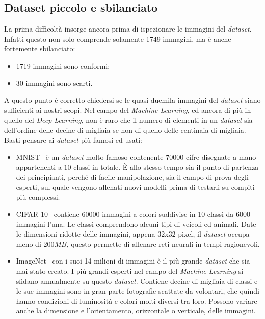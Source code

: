 \subsection{Dataset piccolo e sbilanciato}
La prima difficoltà insorge ancora prima di ispezionare le immagini del \textit{dataset}.
Infatti questo non solo comprende solamente 1749 immagini, ma è anche fortemente sbilanciato:
\begin{itemize}
    \item 1719 immagini sono conformi;
    \item 30 immagini sono scarti.
\end{itemize}
A questo punto è corretto chiedersi se le quasi duemila immagini del \textit{dataset} siano sufficienti ai nostri scopi.
Nel campo del \textit{Machine Learning}, ed ancora di più in quello del \textit{Deep Learning}, non è raro che il numero di elementi in un \textit{dataset} sia dell'ordine delle decine di migliaia se non di quello delle centinaia di migliaia.
Basti pensare ai \textit{dataset} più famosi ed usati:
\begin{itemize}
  \item MNIST~\cite{mnist} è un \textit{dataset} molto famoso contenente $70000$ cifre disegnate a mano appartenenti a $10$ classi in totale.
    È allo stesso tempo sia il punto di partenza dei principianti, perché di facile manipolazione, sia il campo di prova degli esperti, sul quale vengono allenati nuovi modelli prima di testarli su compiti più complessi.

  \item CIFAR-10~\cite{cifar} contiene $60000$ immagini a colori suddivise in 10 classi da 6000 immagini l'una.
    Le classi comprendono alcuni tipi di veicoli ed animali.
    Date le dimensioni ridotte delle immagini, appena $32$x$32$ pixel, il \textit{dataset} occupa meno di $200 MB$, questo permette di allenare reti neurali in tempi ragionevoli.

 \item ImageNet~\cite{imagenet} con i suoi 14 milioni di immagini è il più grande \textit{dataset} che sia mai stato creato.
    I più grandi esperti nel campo del \textit{Machine Learning} si sfidano annualmente su questo \textit{dataset}.
    Contiene decine di migliaia di classi e le sue immagini sono in gran parte fotografie scattate da volontari, che quindi hanno condizioni di luminosità e colori molti diversi tra loro.
    Possono variare anche la dimensione e l'orientamento, orizzontale o verticale, delle immagini.

\end{itemize}

